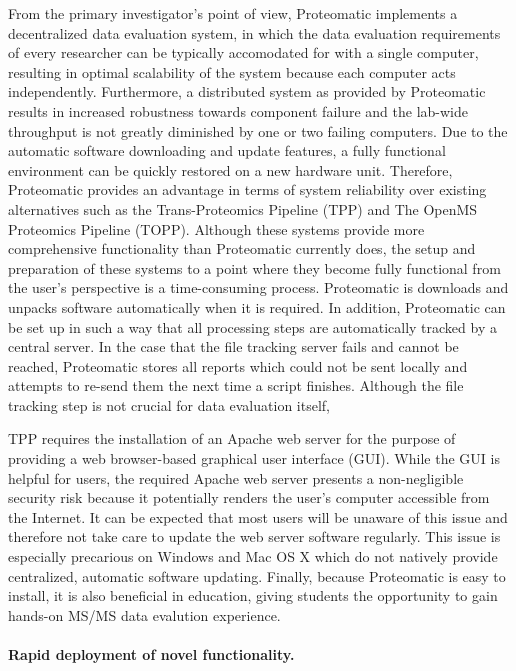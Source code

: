 From the primary investigator's point of view, Proteomatic implements a 
decentralized data evaluation system, in which the data evaluation requirements
of every researcher can be typically accomodated for with a single computer,
resulting in optimal scalability of the system because each computer acts 
independently.
Furthermore, a distributed system as provided by Proteomatic results in 
increased robustness towards component failure and the lab-wide throughput
is not greatly diminished by one or two failing computers.
Due to the automatic software downloading and update features, a fully 
functional environment can be quickly restored on a new hardware unit.
Therefore, Proteomatic provides an advantage in terms of system reliability 
over existing alternatives such as the Trans-Proteomics Pipeline (TPP) and 
The OpenMS Proteomics Pipeline (TOPP).
Although these systems provide more comprehensive functionality than Proteomatic
currently does, the setup and preparation of these systems to a point where
they become fully functional from the user's perspective is a time-consuming 
process.
Proteomatic is downloads and unpacks software automatically when it is required.
In addition, Proteomatic can be set up in such a way that all processing steps
are automatically tracked by a central server.
In the case that the file tracking server fails and cannot be reached, 
Proteomatic stores all reports which could not be sent locally and attempts
to re-send them the next time a script finishes.
Although the file tracking step is not crucial for data evaluation itself,


TPP requires the installation of an Apache web server for the purpose
of providing a web browser-based graphical user interface (GUI).
While the GUI is helpful for users, the required Apache web server presents a 
non-negligible security risk because it potentially renders the user's computer 
accessible from the Internet.
It can be expected that most users will be unaware of this issue and therefore
not take care to update the web server software regularly.
This issue is especially precarious on Windows and Mac OS X which do not 
natively provide centralized, automatic software updating.
Finally, because Proteomatic is easy to install, it is also beneficial in 
education, giving students the opportunity to gain hands-on MS/MS data 
evalution experience.

\paragraph{Rapid deployment of novel functionality.}

